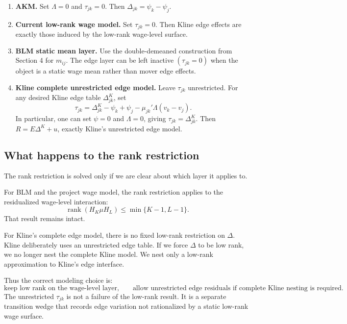 \documentclass[11pt]{article}
\newcommand{\rank}{\operatorname{rank}}
\begin{document}
\begin{enumerate}
\item \textbf{AKM.} Set \(\Lambda=0\) and \(\tau_{jk}=0\). Then
\(\Delta_{jk}=\psi_k-\psi_j\).

\item \textbf{Current low-rank wage model.} Set \(\tau_{jk}=0\). Then Kline edge
effects are exactly those induced by the low-rank wage-level surface.

\item \textbf{BLM static mean layer.} Use the double-demeaned construction from
Section 4 for \(m_{ij}\). The edge layer can be left inactive
\((\tau_{jk}=0)\) when the object is a static wage mean rather than mover edge
effects.

\item \textbf{Kline complete unrestricted edge model.} Leave \(\tau_{jk}\)
unrestricted. For any desired Kline edge table \(\Delta^K_{jk}\), set
\[
\tau_{jk}
=
\Delta^K_{jk}
-\psi_k+\psi_j
-\mu_{jk}'\Lambda(v_k-v_j).
\]
In particular, one can set \(\psi=0\) and \(\Lambda=0\), giving
\(\tau_{jk}=\Delta^K_{jk}\). Then \(R=E\Delta^K+u\), exactly Kline's
unrestricted edge model.
\end{enumerate}

\subsection{What happens to the rank restriction}

The rank restriction is solved only if we are clear about which layer it applies
to.

For BLM and the project wage model, the rank restriction applies to the
residualized wage-level interaction:
\[
\rank(H_K\mu H_L)\leq \min\{K-1,L-1\}.
\]
That result remains intact.

For Kline's complete edge model, there is no fixed low-rank restriction on
\(\Delta\). Kline deliberately uses an unrestricted edge table. If we force
\(\Delta\) to be low rank, we no longer nest the complete Kline model. We nest
only a low-rank approximation to Kline's edge interface.

Thus the correct modeling choice is:
\[
\text{keep low rank on the wage-level layer,}
\qquad
\text{allow unrestricted edge residuals if complete Kline nesting is required.}
\]
The unrestricted \(\tau_{jk}\) is not a failure of the low-rank result. It is a
separate transition wedge that records edge variation not rationalized by a
static low-rank wage surface.
\end{document}
